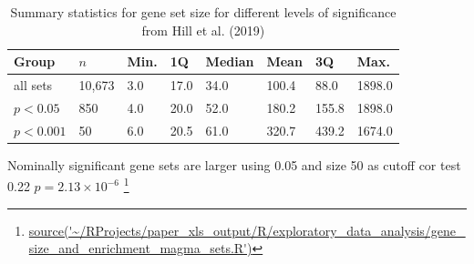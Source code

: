 \begin{table}[]
    \centering
     \setlength{\extrarowheight}{2pt}
    \begin{tabular}{llllllll}
    \toprule
   Group  & $n$ & Min. &1Q & Median  &  Mean &3Q    &Max.\\ 
   \midrule
    all sets &   10,673  &3.0 &    17.0 &   34.0 &  100.4&    88.0&  1898.0 \\
      $p<0.05$ & 850 &4.0  &  20.0 &   52.0 &  180.2  & 155.8 & 1898.0 \\ 
       $p<0.001$ & 50 & 6.0&    20.5    &61.0&   320.7&   439.2  &1674.0     \\
       \bottomrule
     
    \end{tabular}
    \caption[Gene set group size and significance of enrichment]{Summary statistics for gene set size for different levels of significance from Hill et al. (2019)\cite{hill2019combined}}
    \label{tab:group size and enrichment}
\end{table}



Nominally significant gene sets are larger using 0.05 and size 50 as cutoff cor test 0.22 $p = 2.13\times10^{-6}$
\footnote{\url{source('~/RProjects/paper_xls_output/R/exploratory_data_analysis/gene_size_and_enrichment_magma_sets.R')}}

